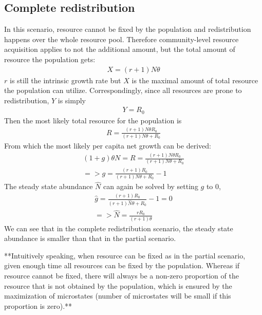 \documentclass[12pt]{article}
\begin{document}
\subsection{Complete redistribution}
In this scenario, resource cannot be fixed by the population and redistribution happens over the whole resource pool. Therefore community-level resource acquisition applies to not the additional amount, but the total amount of resource the population gets:
\begin{equation}
 \begin{split}
X = (r+1) N \theta 
\end{split}
\end{equation}
 $r$ is still the intrinsic growth rate but $X$ is the maximal amount of total resource the population can utilize. Correspondingly, since all resources are prone to redistribution, $Y$ is simply
 \begin{equation}
 \begin{split}
Y = R_0
\end{split}
\end{equation}
Then the most likely total resource for the population is 
 \begin{equation}
 \begin{split}
R = \frac{(r+1) N \theta  R_0}{(r+1) N \theta +R_0}
\end{split}
\end{equation}
From which the most likely per capita net growth can be derived:
 \begin{equation}
 \begin{split}
(1+g) \theta N = R = \frac{(r+1) N \theta  R_0}{(r+1) N \theta +R_0}\\
 = > g = \frac{(r+1) R_0}{(r+1) N \theta +R_0} -1
\end{split}
\end{equation}
The steady state abundance $\hat{N}$ can again be solved by setting $g$ to 0,
 \begin{equation}
 \begin{split}
\hat{g} = \frac{(r+1) R_0}{(r+1) \hat{N} \theta +R_0} -1 = 0\\
 = > \hat{N} = \frac{r R_0}{(r+1) \theta}
\end{split}
\end{equation}
We can see that in the complete redistribution scenario, the steady state abundance is smaller than that in the partial scenario. 

**Intuitively speaking, when resource can be fixed as in the partial scenario, given enough time all resources can be fixed by the population. Whereas if resource cannot be fixed, there will always be a non-zero proportion of the resource that is not obtained by the population, which is ensured by the maximization of microstates (number of microstates will be small if this proportion is zero).**
\end{document}
